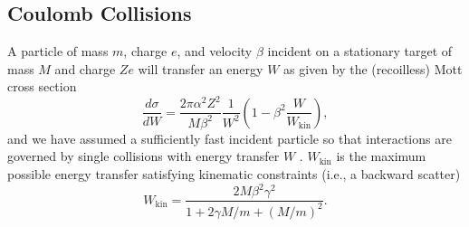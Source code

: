 \documentclass[twocolumn,showpacs,preprintnumbers,amsmath,amssymb,prd]{revtex4}
\def\r{\right)}
\def\l{\left(}
\begin{document}
\begin{appendices}
\subsection{Coulomb Collisions}
A particle of mass $m$, charge $e$, and velocity $\beta$ incident on a stationary target of mass $M$ and charge $Ze$ will transfer an energy $W$ as given by the (recoilless) Mott cross section 
\begin{equation}
  \frac{d \sigma}{dW} = \frac{2 \pi \alpha^2 Z^2}{M \beta^2} \frac{1}{W^2} 
    \l 1-\beta^2 \frac{W}{W_\text{kin}} \r,
\label{eq:mott}
\end{equation}
and we have assumed a sufficiently fast incident particle so that interactions are governed by single collisions with energy transfer $W$ \cite{Agashe:2014kda}.
$W_\text{kin}$ is the maximum possible energy transfer satisfying kinematic constraints (i.e., a backward scatter)
\begin{equation}
\label{eq:ekin}
  W_{\text{kin}} = \frac{2 M \beta^2 \gamma^2}{1+ 2\gamma M/m +(M/m)^2}.
\end{equation}



\end{appendices}
\end{document}
